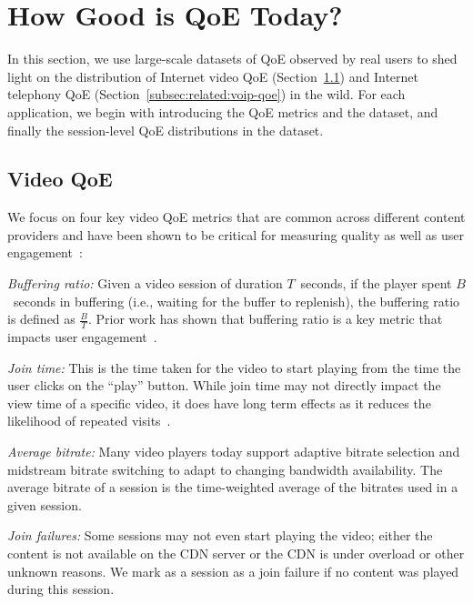 \section{How Good is QoE Today?}
\label{sec:related:qoe}

In this section, we use large-scale datasets of QoE observed by
real users to shed light on the distribution of Internet video QoE
(Section~\ref{subsec:related:video-qoe}) and Internet telephony QoE
(Section~\ref{subsec:related:voip-qoe}) in the wild. 
For each application, we begin with introducing the QoE metrics and 
the dataset, and finally the session-level 
QoE distributions in the dataset.

\subsection{Video QoE}
\label{subsec:related:video-qoe}

We focus on  four key video QoE metrics that are common across 
different  content providers and have been shown to be
 critical for measuring quality as well as user
  engagement~\cite{sigcomm11}: 
\begin{packedenumerate}

\item \emph{Buffering ratio:}  Given a video session of 
duration $T$~seconds,  if the player spent $B$~seconds in 
buffering (i.e., waiting for the 
 buffer to replenish), the buffering ratio is defined as 
 $\frac{B}{T}$. 
 Prior work has shown that buffering ratio is a key metric
 that impacts user engagement~\cite{sigcomm11}.

\item \emph{Join time:}  This is the time taken for the video 
to start playing  from the time the user clicks on the ``play'' 
button. 
While join time may not directly impact the view time of a 
specific video,
it does have long term effects as it reduces the likelihood 
of repeated visits~\cite{sigcomm11,akamai-imc12}.  
 

\item \emph{Average bitrate:} 
Many video players today support adaptive bitrate
selection and midstream bitrate switching to adapt to 
changing bandwidth availability. 
The average bitrate of a session is the time-weighted
average of the bitrates used in a given session. 


\item \emph{Join failures:}   Some sessions may not even 
start playing the video; either the content is not available
 on the CDN server or the CDN is under overload or other 
unknown reasons. We mark as a session as a join failure
if no content was played during this session.

\end{packedenumerate}


